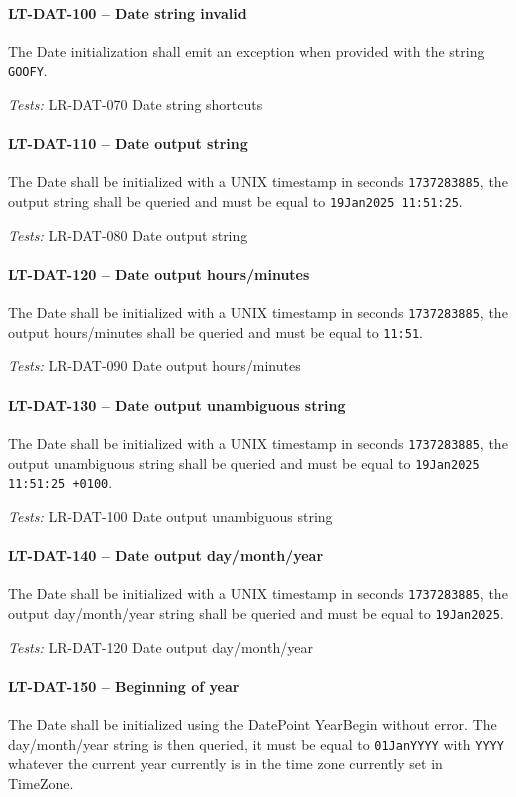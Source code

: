 \paragraph{LT-DAT-100 -- Date string invalid}
The Date initialization shall emit an exception when provided
with the string \lstinline{GOOFY}.

\textit{Tests: } LR-DAT-070 Date string shortcuts

\paragraph{LT-DAT-110 -- Date output string}
The Date shall be initialized with a UNIX timestamp in seconds
\lstinline{1737283885}, the output string shall be queried and
must be equal to \lstinline{19Jan2025 11:51:25}.

\textit{Tests: } LR-DAT-080 Date output string

\paragraph{LT-DAT-120 -- Date output hours/minutes}
The Date shall be initialized with a UNIX timestamp in seconds
\lstinline{1737283885}, the output hours/minutes shall be queried
and must be equal to \lstinline{11:51}.

\textit{Tests: } LR-DAT-090 Date output hours/minutes

\paragraph{LT-DAT-130 -- Date output unambiguous string}
The Date shall be initialized with a UNIX timestamp in seconds
\lstinline{1737283885}, the output unambiguous string shall
be queried and must be equal to \lstinline{19Jan2025 11:51:25 +0100}.

\textit{Tests: } LR-DAT-100 Date output unambiguous string

\paragraph{LT-DAT-140 -- Date output day/month/year}
The Date shall be initialized with a UNIX timestamp in seconds
\lstinline{1737283885}, the output day/month/year string shall
be queried and must be equal to \lstinline{19Jan2025}.

\textit{Tests: } LR-DAT-120 Date output day/month/year

\paragraph{LT-DAT-150 -- Beginning of year}
The Date shall be initialized using the DatePoint YearBegin without error.
The day/month/year string is then queried, it must be equal to
\lstinline{01JanYYYY} with \lstinline{YYYY} whatever the current year
currently is in the time zone currently set in TimeZone.


